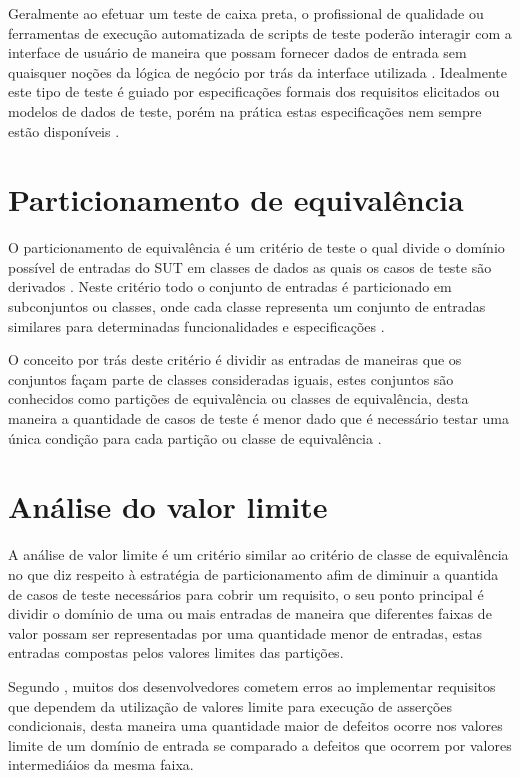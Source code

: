 \documentclass[
	12pt,				%
	oneside,			%
	a4paper,			%
	english,			%
	brazil				%
	]{abntex2ppgsi}
\begin{document}
Geralmente ao efetuar um teste de caixa preta, o profissional de qualidade ou ferramentas de execução automatizada de scripts de teste poderão interagir com a interface de usuário de maneira que possam fornecer dados de entrada sem quaisquer noções da lógica de negócio por trás da interface utilizada \cite{Xu2016}. Idealmente este tipo de teste é guiado por especificações formais dos requisitos elicitados ou modelos de dados de teste, porém na prática estas especificações nem sempre estão disponíveis \cite{Walkinshaw2017}.

\section{Particionamento de equivalência}
O particionamento de equivalência é um critério de teste o qual divide o domínio possível de entradas do SUT em classes de dados as quais os casos de teste são derivados  \cite{Jacob2016}. Neste critério  todo o conjunto de entradas é particionado em subconjuntos ou classes, onde cada classe representa um conjunto de entradas similares para determinadas funcionalidades e especificações \cite{Jacob2016}.

O conceito por trás deste critério  é dividir as entradas de maneiras que os conjuntos façam parte de classes consideradas iguais, estes conjuntos são conhecidos como partições de equivalência ou classes de equivalência, desta maneira a quantidade de casos de teste  é menor dado que é necessário testar uma única condição para cada partição ou classe de equivalência \cite{Jacob2016}.

\section{Análise do valor limite}
A análise de valor limite é um critério similar ao critério de classe de equivalência no que diz respeito à estratégia de particionamento afim de diminuir a quantida de casos de teste necessários para cobrir um requisito, o seu ponto principal é dividir o domínio de uma ou mais entradas de maneira que diferentes faixas de valor possam ser representadas por uma quantidade menor de entradas, estas entradas compostas pelos valores limites das partições.

Segundo \cite{Jacob2016}, muitos dos desenvolvedores cometem erros ao implementar requisitos que dependem da utilização de valores limite para execução de asserções condicionais, desta maneira uma quantidade maior de defeitos ocorre nos valores limite de um domínio de entrada se comparado a defeitos que ocorrem por valores intermediáios da mesma faixa.
\end{document}
